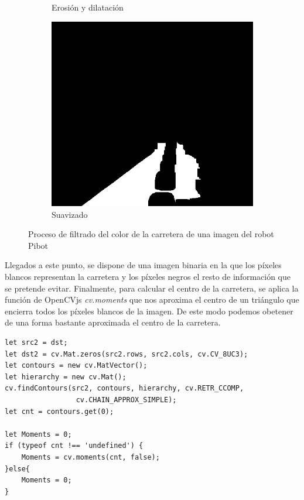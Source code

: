 \documentclass{report}
\begin{document}
\begin{figure}[h]
\begin{subfigure}{.5\textwidth}
  \caption{Erosión y dilatación}
  \label{fig:sub-third}
\end{subfigure}
\begin{subfigure}{.5\textwidth}
  \centering
  \includegraphics[width=.7\linewidth]{images/cap4/erode.png}  
  \caption{Suavizado}
  \label{fig:sub-fourth}
\end{subfigure}
\caption{Proceso de filtrado del color de la carretera de una imagen del robot Pibot}
\label{fig:fig}
\end{figure}

Llegados a este punto, se dispone de una imagen binaria en la que los píxeles blancos representan la carretera y los píxeles negros el resto de información que se pretende evitar. Finalmente, para calcular el centro de la carretera, se aplica la función de OpenCVjs \textit{cv.moments} que nos aproxima el centro de un triángulo que encierra todos los píxeles blancos de la imagen. De este modo podemos obetener de una forma bastante aproximada el centro de la carretera.

\newpage
\begin{lstlisting}[backgroundcolor = \color{light-gray},
				   aboveskip = 2em,
				   belowskip = 2em,
                   xleftmargin = 2cm,
                   framexleftmargin = 1em,
                   basicstyle=\small]
let src2 = dst;
let dst2 = cv.Mat.zeros(src2.rows, src2.cols, cv.CV_8UC3);
let contours = new cv.MatVector();
let hierarchy = new cv.Mat();
cv.findContours(src2, contours, hierarchy, cv.RETR_CCOMP,
				 cv.CHAIN_APPROX_SIMPLE);
let cnt = contours.get(0);

let Moments = 0;
if (typeof cnt !== 'undefined') {
	Moments = cv.moments(cnt, false);
}else{
	Moments = 0;
}

\end{lstlisting}
\end{document}
